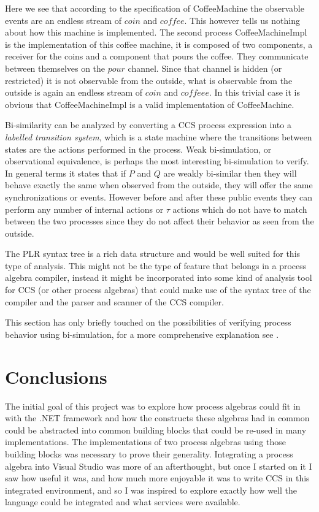 	Here we see that according to the specification of \textsf{CoffeeMachine} 
	the observable events are an endless stream of $coin$ and $coffee$. This 
	however tells us nothing about how this machine is implemented. The second 
	process \textsf{CoffeeMachineImpl} is the implementation of this coffee 
	machine, it is composed of two components, a receiver for the coins and a 
	component that pours the coffee. They communicate between themselves on the 
	$pour$ channel. Since that channel is hidden (or restricted) it is not 
	observable from the outside, what is observable from the outside is again an 
	endless stream of $coin$ and $coffeee$. In this trivial case it is obvious 
	that \textsf{CoffeeMachineImpl} is a valid implementation of 
	\textsf{CoffeeMachine}.
	
	Bi-similarity can be analyzed by converting a CCS process expression into a 
	\textit{labelled transition system}, which is a state machine where the 
	transitions between states are the actions performed in the process. Weak 
	bi-simulation, or observational equivalence, is perhaps the most interesting 
	bi-simulation to verify. In general terms it states that if $P$ and $Q$ are 
	weakly bi-similar then they will behave exactly the same when observed from 
	the outside, they will offer the same synchronizations or events. However 
	before and after these public events they can perform any number of internal 
	actions or $\tau$ actions which do not have to match between the two 
	processes since they do not affect their behavior as seen from the outside. 
	
	The PLR syntax tree is a rich data structure and would be well suited for 
	this type of analysis. This might not be the type of feature that belongs in 
	a process algebra compiler, instead it might be incorporated into some kind 
	of analysis tool for CCS (or other process algebras) that could make use of 
	the syntax tree of the compiler and the parser and scanner of the CCS 
	compiler. 
	
	This section has only briefly touched on the possibilities of verifying 
	process behavior using bi-simulation, for a more comprehensive explanation 
	see \cite{reactive}.
	
\section{Conclusions}

	The initial goal of this project was to explore how process algebras could 
	fit in with the .NET framework and how the constructs these algebras had in 
	common could be abstracted into common building blocks that could be re-used 
	in many implementations. The implementations of two process algebras using 
	those building blocks was necessary to prove their generality. Integrating a 
	process algebra into Visual Studio was more of an afterthought, but once I 
	started on it I saw how useful it was, and how much more enjoyable it was to 
	write CCS in this integrated environment, and so I was inspired to explore 
	exactly how well the language could be integrated and what services were 
	available.
	
